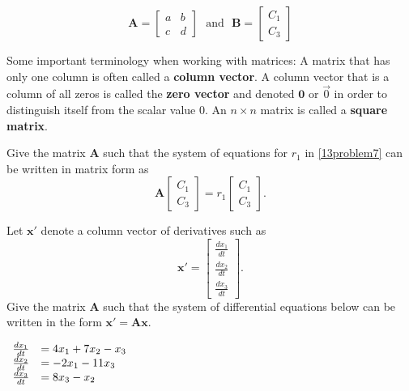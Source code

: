 \ii 
\[ \mathbf{A} =  \left[ \begin{array}{cc} a & b  \\ c & d \end{array} \right] \ \ \ \mbox{and} \ \ \ 
 \mathbf{B} = \left[ \begin{array}{c} C_1 \\ C_3   \end{array} \right] \]
\vfill
\ee
\ee

Some important terminology when working with matrices:
\bi
\ii A matrix that has only one column is often called a \textbf{column vector}.
\ii A column vector that is a column of all zeros is called the \textbf{zero vector} and denoted $\mathbf{0}$ or $\vec{0}$ in order to distinguish itself from the scalar value 0.
\ii An $n \times n$ matrix is called a \textbf{square matrix}.
\ei

\bb[resume]
\ii Give the matrix $\mathbf{A}$ such that the system of equations for $r_1$ in \ref{13problem7} can be written in matrix form as \label{13problem9}
\[ \mathbf{A}  \left[ \begin{array}{c} C_1 \\ C_3   \end{array} \right] = r_1  \left[ \begin{array}{c} C_1 \\ C_3   \end{array} \right].\]
\vfill

\clearpage


\ii Let $\mathbf{x'}$ denote a column vector of derivatives such as
\[ \mathbf{x'} =  \left[ \begin{array}{c} \frac{dx_1}{dt} \\ \frac{dx_2}{dt} \\ \frac{dx_3}{dt}  \end{array} \right] . \]
Give the matrix $\mathbf{A}$ such that the system of differential equations below can be written in the form $\mathbf{x'} = \mathbf{A} \mathbf{x}$.\label{13problem10}

\ms

$\displaystyle \begin{array}{rl}
\frac{dx_1}{dt} &= 4 x_1 + 7 x_2 - x_3 \\
\frac{dx_2}{dt} &= -2x_1-11x_3\\
\frac{dx_3}{dt} &= 8x_3-x_2
\end{array}$ \vfill



